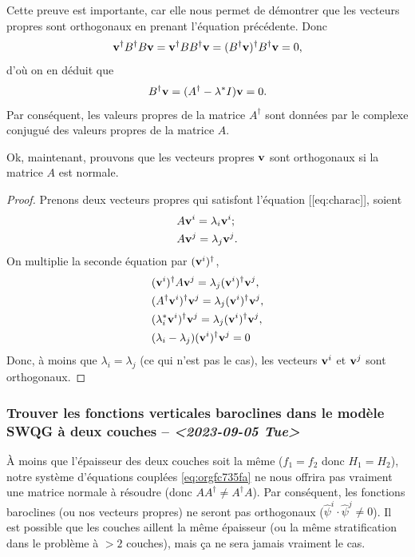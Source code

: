 \documentclass[10pt]{report}
\numberwithin{equation}{section}
\newcommand{\vv}{\vb{v}}
\begin{document}
Cette preuve est importante, car elle nous permet de démontrer que les vecteurs propres sont orthogonaux en prenant l'équation précédente.
Donc
\begin{equation}
   \vv^\dagger B^\dagger B \vv = \vv^\dagger BB^\dagger \vv = (B^\dagger \vv)^\dagger B^\dagger \vv = 0,
\end{equation}
d'où on en déduit que
\begin{equation}
   B^\dagger \vv = (A^\dagger -\lambda^* I ) \vv = 0.
\end{equation}
Par conséquent, les valeurs propres de la matrice \(A^\dagger\) sont données par le complexe conjugué des valeurs propres de la matrice \(A\). \bigskip

Ok, maintenant, prouvons que les vecteurs propres \(\vv\) sont orthogonaux si la matrice \(A\) est normale.
\begin{proof}
Prenons deux vecteurs propres qui satisfont l'équation [[eq:charac]], soient
\begin{subequations}
\begin{align}
   &A \vv^i = \lambda_i\vv^i;\\
   &A \vv^j = \lambda_j\vv^j.
\end{align}
\end{subequations}
On multiplie la seconde équation par $(\vv^i)^\dagger$,
\begin{align}
   & (\vv^i)^\dagger A\vv^j = \lambda_j(\vv^i)^\dagger\vv^j,\nonumber\\
   & (A^\dagger\vv^i)^\dagger\vv^j = \lambda_j(\vv^i)^\dagger\vv^j,\nonumber\\
   & (\lambda_i^*\vv^i)^\dagger\vv^j = \lambda_j(\vv^i)^\dagger\vv^j,\nonumber\\
   & (\lambda_i - \lambda_j) (\vv^i)^\dagger\vv^j = 0
\end{align}
Donc, à moins que $\lambda_i = \lambda_j$ (ce qui n'est pas le cas), les vecteurs $\vv^i$ et $\vv^j$ sont orthogonaux. \end{proof}

\subsubsection{Trouver les fonctions verticales baroclines dans le modèle SWQG à deux couches -- \textit{<2023-09-05 Tue>}}
\label{sec:orgfae7404}

À moins que l'épaisseur des deux couches soit la même (\(f_1 = f_2\) donc \(H_1 = H_2\)), notre système d'équations couplées \ref{eq:orgfc735fa} ne nous offrira pas vraiment une matrice normale à résoudre (donc \(AA^\dagger\not=A^\dagger A\)).
Par conséquent, les fonctions baroclines (ou nos vecteurs propres) ne seront pas orthogonaux (\(\hat{\psi}^i \cdot \hat{\psi}^j \not= 0\)).
Il est possible que les couches aillent la même épaisseur (ou la même stratification dans le problème à \(>2\) couches), mais ça ne sera jamais vraiment le cas.\bigskip
\end{document}
